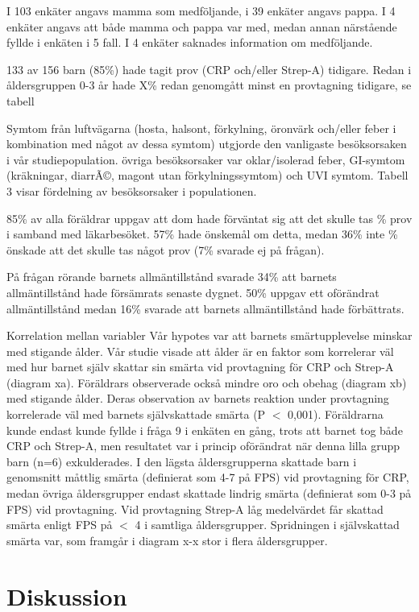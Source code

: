 \documentclass[12pt,twocolumn]{article}
\begin{document}
I 103 enkäter angavs mamma som medföljande, i 39 enkäter angavs pappa. I 4
enkäter angavs att både mamma och pappa var med, medan annan
närstående fyllde i enkäten i 5 fall. I 4 enkäter  saknades
information om medföljande.

133 av 156 barn (85\%) hade tagit prov (CRP och/eller Strep-A) tidigare. Redan i
åldersgruppen 0-3 år hade X\% redan genomgått minst en provtagning
tidigare, se tabell 

Symtom från luftvägarna (hosta, halsont, förkylning, öronvärk
och/eller feber i kombination med något av dessa symtom) utgjorde den
vanligaste besöksorsaken i vår studiepopulation. övriga besöksorsaker
var oklar/isolerad feber, GI-symtom (kräkningar, diarrÃ©, magont utan
förkylningssymtom) och UVI symtom. Tabell 3 visar fördelning av
besöksorsaker i populationen.

85\% av alla föräldrar uppgav att dom hade förväntat sig att det skulle
tas \% prov i samband med läkarbesöket. 57\% hade önskemål om detta,
medan 36\% inte \% önskade att det skulle tas något prov (7\% svarade ej
på frågan).

På frågan rörande barnets allmäntillstånd svarade 34\% att
barnets allmäntillstånd hade försämrats senaste dygnet. 50\% uppgav
ett oförändrat allmäntillstånd medan 16\% svarade att barnets
allmäntillstånd hade förbättrats.

Korrelation mellan variabler Vår hypotes var att barnets smärtupplevelse minskar
med stigande ålder. Vår studie visade att ålder är en faktor som korrelerar väl
med hur barnet själv skattar sin smärta vid provtagning för CRP och Strep-A
(diagram xa). Föräldrars observerade också mindre oro och obehag (diagram xb)
med stigande ålder. Deras observation av barnets reaktion under provtagning
korrelerade väl med barnets självskattade smärta (P $<$ 0,001).
Föräldrarna kunde endast kunde fyllde i fråga 9 i enkäten en gång, trots att barnet tog både CRP
och Strep-A, men resultatet var i princip oförändrat när denna lilla grupp barn
(n=6) exkulderades. I den lägsta åldersgrupperna skattade barn i genomsnitt
måttlig smärta (definierat som 4-7 på FPS) vid provtagning för CRP, medan övriga
åldersgrupper endast skattade lindrig smärta (definierat som 0-3 på FPS) vid
provtagning. Vid provtagning Strep-A låg medelvärdet får skattad smärta enligt
FPS på $<$ 4 i samtliga åldersgrupper. Spridningen i självskattad
smärta var, som framgår i diagram x-x stor i flera åldersgrupper.

\section{Diskussion}
\end{document}

